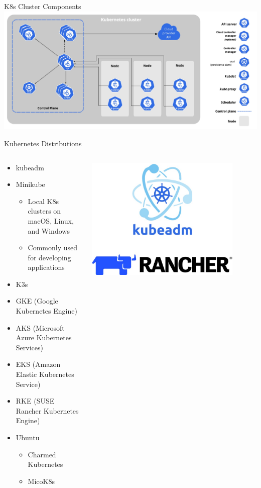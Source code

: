 \begin{frame}{K8s Cluster Components}
\centering
\includegraphics[height=0.7\textheight]{images/k8s_cluster.jpg}
\end{frame}

\begin{frame}{Kubernetes Distributions}
\scriptsize
\begin{columns}[c]
\begin{column}{0.5\textwidth}
\begin{itemize}
\item kubeadm
\item Minikube
\begin{itemize}
\item Local K8s clusters on macOS, Linux, and Windows
\item Commonly used for developing applications
\end{itemize}
\item K3s
\item GKE (Google Kubernetes Engine)
\item AKS (Microsoft Azure Kubernetes Services)
\item EKS (Amazon Elastic Kubernetes Service)
\item RKE (SUSE Rancher Kubernetes Engine)
\item Ubuntu
\begin{itemize}
\item Charmed Kubernetes
\item MicoK8s 
\end{itemize}
\end{itemize}
\end{column}
\begin{column}{0.5\textwidth}
\centering
\includegraphics[width=0.85\textwidth]{images/k8s_distributions.jpg}

\end{column}
\end{columns}
\end{frame}
